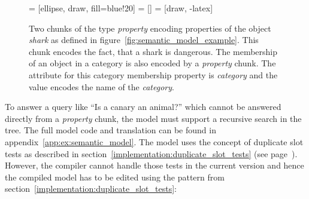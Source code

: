 \begin{figure}[htb]
\centering
{} = [ellipse, draw, fill=blue!20]
 = [] 
 = [draw, -latex]   
\qquad
{}
\caption{Two chunks of the type \emph{property} encoding properties of the object \emph{shark} as defined in figure~\ref{fig:semantic_model_example}.  This chunk encodes the fact, that a shark is dangerous.  The membership of an object in a category is also encoded by a \emph{property} chunk. The attribute for this category membership property is \emph{category} and the value encodes the name of the \emph{category}.}
\label{fig:semantic_model_example:chunks}
\end{figure}


To answer a query like ``Is a canary an animal?'' which cannot be answered directly from a \emph{property} chunk, the model must support a recursive search in the tree. The full model code and translation can be found in appendix~\ref{app:ex:semantic_model}. The model uses the concept of duplicate slot tests as described in section~\ref{implementation:duplicate_slot_tests} (see page~\pageref{implementation:duplicate_slot_tests}). However, the compiler cannot handle those tests in the current version and hence the compiled model has to be edited using the pattern from section~\ref{implementation:duplicate_slot_tests}:

